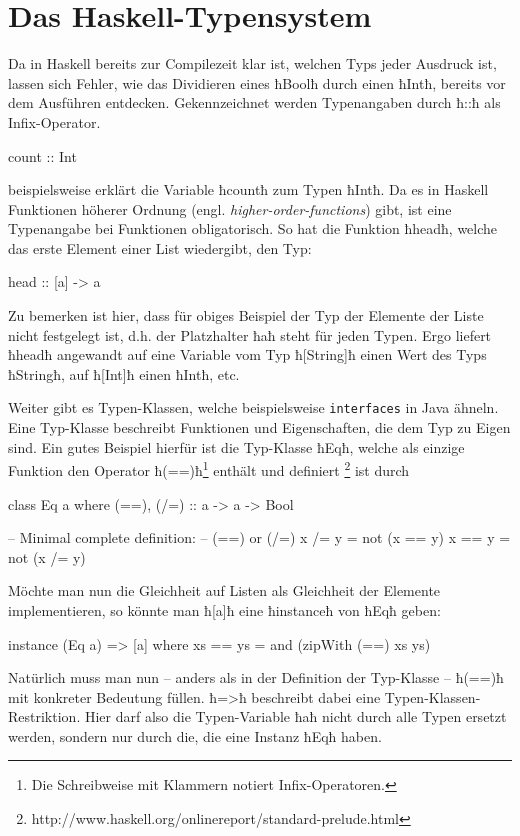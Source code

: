 \section{Das Haskell-Typensystem}
Da in Haskell bereits zur Compilezeit klar ist, welchen Typs jeder Ausdruck
ist, lassen sich Fehler, wie das Dividieren eines ħBoolħ durch einen ħIntħ,
bereits vor dem Ausführen entdecken.
Gekennzeichnet werden Typenangaben durch ħ::ħ als
Infix-Operator.
\begin{hcode}
count :: Int
\end{hcode}
beispielsweise erklärt die Variable ħcountħ zum Typen ħIntħ.
Da es in Haskell Funktionen höherer Ordnung (engl.
\emph{higher-order-functions}) gibt, ist eine Typenangabe bei Funktionen
obligatorisch. 
So hat die Funktion ħheadħ, welche das erste Element einer List wiedergibt, 
den Typ:
\begin{hcode}
head :: [a] -> a
\end{hcode}
Zu bemerken ist hier, dass für obiges Beispiel der Typ der Elemente der Liste
nicht festgelegt ist, d.h. der Platzhalter ħaħ steht für jeden Typen.
Ergo liefert ħheadħ angewandt auf eine Variable vom Typ ħ[String]ħ einen Wert
des Typs ħStringħ, auf ħ[Int]ħ einen ħIntħ, etc.

Weiter gibt es Typen-Klassen, welche beispielsweise \texttt{interfaces} in Java
ähneln. Eine Typ-Klasse beschreibt Funktionen und Eigenschaften, die dem Typ zu
Eigen sind.  Ein gutes Beispiel hierfür ist die Typ-Klasse ħEqħ, welche als
einzige Funktion den Operator ħ(==)ħ\footnote{Die Schreibweise mit Klammern
notiert Infix-Operatoren.} enthält und definiert%
\footnote{http://www.haskell.org/onlinereport/standard-prelude.html}
ist durch
\begin{hcode}
class  Eq a  where
  (==), (/=) :: a -> a -> Bool

      -- Minimal complete definition:
      --      (==) or (/=)
  x /= y     =  not (x == y)
  x == y     =  not (x /= y) 
\end{hcode}
Möchte man nun die Gleichheit auf Listen als Gleichheit der Elemente 
implementieren, so könnte man ħ[a]ħ eine ħinstanceħ von ħEqħ geben:
\begin{hcode}
instance (Eq a) => [a] where
  xs == ys  = and (zipWith (==) xs ys)
\end{hcode}
Natürlich muss man nun -- anders als in der Definition der Typ-Klasse -- 
ħ(==)ħ mit konkreter Bedeutung füllen.
ħ=>ħ beschreibt dabei eine Typen-Klassen-Restriktion.
Hier darf also die Typen-Variable ħaħ nicht durch alle Typen ersetzt werden,
sondern nur durch die, die eine Instanz ħEqħ haben. 

